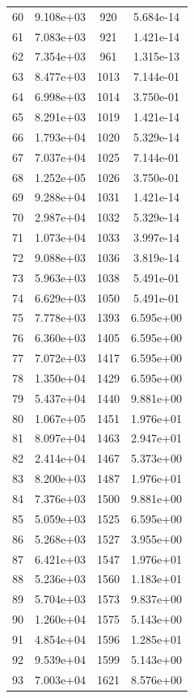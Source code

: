 \documentclass[12pt]{article}
\begin{document}
\begin{longtable}{@{}cccc@{}}
60 & 9.108e+03 & 920 & 5.684e-14 \\
61 & 7.083e+03 & 921 & 1.421e-14 \\
62 & 7.354e+03 & 961 & 1.315e-13 \\
63 & 8.477e+03 & 1013 & 7.144e-01 \\
64 & 6.998e+03 & 1014 & 3.750e-01 \\
65 & 8.291e+03 & 1019 & 1.421e-14 \\
66 & 1.793e+04 & 1020 & 5.329e-14 \\
67 & 7.037e+04 & 1025 & 7.144e-01 \\
68 & 1.252e+05 & 1026 & 3.750e-01 \\
69 & 9.288e+04 & 1031 & 1.421e-14 \\
70 & 2.987e+04 & 1032 & 5.329e-14 \\
71 & 1.073e+04 & 1033 & 3.997e-14 \\
72 & 9.088e+03 & 1036 & 3.819e-14 \\
73 & 5.963e+03 & 1038 & 5.491e-01 \\
74 & 6.629e+03 & 1050 & 5.491e-01 \\
75 & 7.778e+03 & 1393 & 6.595e+00 \\
76 & 6.360e+03 & 1405 & 6.595e+00 \\
77 & 7.072e+03 & 1417 & 6.595e+00 \\
78 & 1.350e+04 & 1429 & 6.595e+00 \\
79 & 5.437e+04 & 1440 & 9.881e+00 \\
80 & 1.067e+05 & 1451 & 1.976e+01 \\
81 & 8.097e+04 & 1463 & 2.947e+01 \\
82 & 2.414e+04 & 1467 & 5.373e+00 \\
83 & 8.200e+03 & 1487 & 1.976e+01 \\
84 & 7.376e+03 & 1500 & 9.881e+00 \\
85 & 5.059e+03 & 1525 & 6.595e+00 \\
86 & 5.268e+03 & 1527 & 3.955e+00 \\
87 & 6.421e+03 & 1547 & 1.976e+01 \\
88 & 5.236e+03 & 1560 & 1.183e+01 \\
89 & 5.704e+03 & 1573 & 9.837e+00 \\
90 & 1.260e+04 & 1575 & 5.143e+00 \\
91 & 4.854e+04 & 1596 & 1.285e+01 \\
92 & 9.539e+04 & 1599 & 5.143e+00 \\
93 & 7.003e+04 & 1621 & 8.576e+00 \\

\end{longtable}
\end{document}
